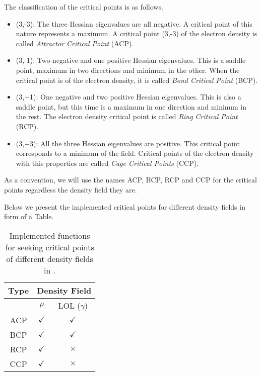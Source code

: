 The classification of the critical points is as follows.
\begin{itemize}
   \item (3,-3): The three Hessian eigenvalues are all negative. A critical point of this nature represents a maximum. A critical point (3,-3) of the electron density is called \textit{Attractor Critical Point} (ACP).
   \item (3,-1): Two negative and one positive Hessian eigenvalues. This is a saddle point, maximum in two directions and minimum in the other. When the critical point is of the electron density, it is called \textit{Bond Critical Point} (BCP).
   \item (3,+1): One negative and two positive Hessian eigenvalues. This is also a saddle point, but this time is a maximum in one direction and mininum in the rest. The electron density critical point is called \textit{Ring Critical Point} (RCP).
   \item (3,+3): All the three Hessian eigenvalues are positive. This critical point corresponds to a minimum of the field. Critical points of the electron density with this properties are called \textit{Cage Critical Points} (CCP).
\end{itemize}

As a convention, we will use the names ACP, BCP, RCP and CCP for the critical points regardless the density field they are.

Below we present the implemented critical points for different density fields in form of a Table.
%
\begin{table}[hb!]
\begin{center}
\begin{tabular}{||c|c|c||}
\hline
\hline
\textbf{Type} & \multicolumn{2}{|c||}{\textbf{Density Field}} \\
\hline
\hline
 & $\rho$ & LOL ($\gamma$) \\
\hline
ACP & $\checkmark$ & $\checkmark$ \\\hline
BCP & $\checkmark$ & $\checkmark$ \\\hline
RCP & $\checkmark$ & $\boldsymbol{\times}$ \\\hline
CCP & $\checkmark$ & $\boldsymbol{\times}$ \\\hline
\hline
\end{tabular}
\caption{Implemented functions for seeking critical points of different density fields in \DTK{} \dtkversion.}\label{tab:implemseeks}
\end{center}
\end{table}

